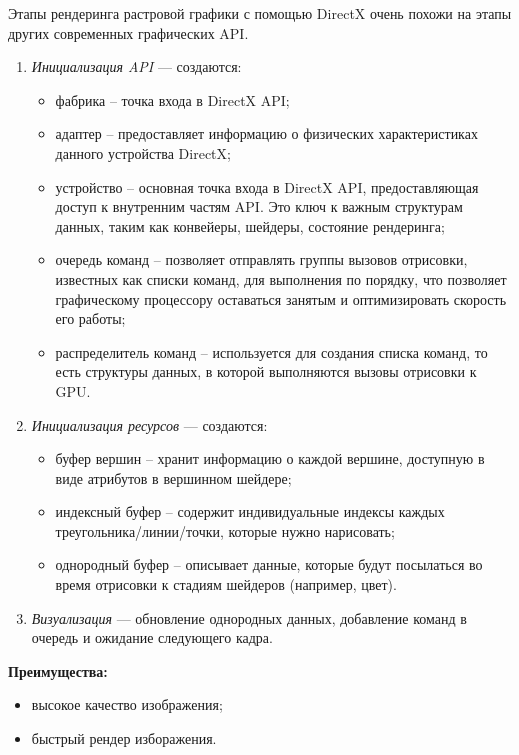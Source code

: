 Этапы рендеринга растровой графики с помощью DirectX очень похожи на этапы других современных графических API. 

\begin{enumerate}
    \item \textit{Инициализация API} — создаются:

    \begin{itemize}
        \item фабрика -- точка входа в DirectX API;
        \item адаптер -- предоставляет информацию о физических характеристиках данного устройства DirectX;
        \item устройство -- основная точка входа в DirectX API, предоставляющая доступ к внутренним частям API. Это ключ к важным структурам данных, таким как конвейеры, шейдеры, состояние рендеринга;
        \item очередь команд -- позволяет отправлять группы вызовов отрисовки, известных как списки команд, для выполнения по порядку, что позволяет графическому процессору оставаться занятым и оптимизировать скорость его работы;
        \item распределитель команд -- используется для создания списка команд, то есть структуры данных, в которой выполняются вызовы отрисовки к GPU.
    \end{itemize}
    \item \textit{Инициализация ресурсов} — создаются:
    \begin{itemize}
        \item буфер вершин -- хранит информацию о каждой вершине, доступную в виде атрибутов в вершинном шейдере;
        \item индексный буфер -- содержит индивидуальные индексы каждых треугольника/линии/точки, которые нужно нарисовать;
        \item однородный буфер -- описывает данные, которые будут посылаться во время отрисовки к стадиям шейдеров (например, цвет).
    \end{itemize}
    \item \textit{Визуализация} — обновление однородных данных, добавление команд в очередь и ожидание следующего кадра.
\end{enumerate}


\textbf{Преимущества:} 
\begin{itemize}
    \item высокое качество изображения;
    \item быстрый рендер изборажения.
\end{itemize}

